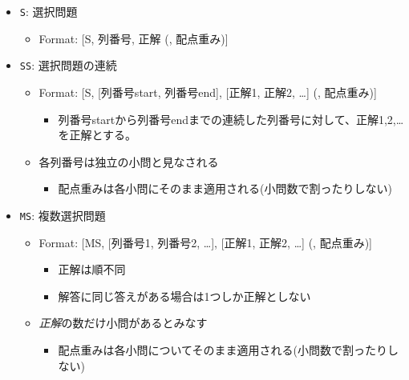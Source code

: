 \begin{itemize}
\item \texttt{S}: 選択問題

\begin{itemize}
\item Format: {[S, 列番号, 正解 (, 配点重み)]}

\end{itemize}

\item \texttt{SS}: 選択問題の連続

\begin{itemize}
\item Format: {[S, {[列番号start, 列番号end]}, {[正解1, 正解2, {\ldots}]} (, 配点重み)]}

\begin{itemize}
\item 列番号startから列番号endまでの連続した列番号に対して、正解1,2,{\ldots}を正解とする。

\end{itemize}

\item 各列番号は独立の小問と見なされる

\begin{itemize}
\item 配点重みは各小問にそのまま適用される(小問数で割ったりしない)

\end{itemize}

\end{itemize}

\item \texttt{MS}: 複数選択問題

\begin{itemize}
\item Format: {[MS, {[列番号1, 列番号2, {\ldots}]}, {[正解1, 正解2, {\ldots}]} (, 配点重み)]}

\begin{itemize}
\item 正解は順不同

\item 解答に同じ答えがある場合は1つしか正解としない

\end{itemize}

\item \emph{正解}の数だけ小問があるとみなす

\begin{itemize}
\item 配点重みは各小問についてそのまま適用される(小問数で割ったりしない)


\end{itemize}
\end{itemize}
\end{itemize}
